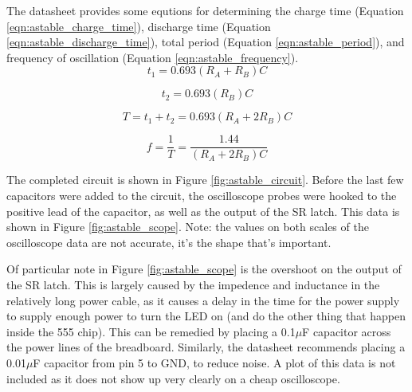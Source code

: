 \documentclass[12pt]{article}
\begin{document}
\begin{FlushLeft}
The datasheet provides some equtions for determining the charge time (Equation \ref{eqn:astable_charge_time}), discharge time (Equation \ref{eqn:astable_discharge_time}), total period (Equation \ref{eqn:astable_period}), and frequency of oscillation (Equation \ref{eqn:astable_frequency}). \\

\begin{equation}
  \label{eqn:astable_charge_time}
  t_1 = 0.693 ( R_A + R_B ) C
\end{equation}

\begin{equation}
  \label{eqn:astable_discharge_time}
  t_2 = 0.693 ( R_B ) C
\end{equation}

\begin{equation}
  \label{eqn:astable_period}
  T = t_1 + t_2 = 0.693 ( R_A + 2 R_B ) C
\end{equation}

\begin{equation}
  \label{eqn:astable_frequency}
  f = \frac{1}{T} = \frac{1.44}{( R_A + 2 R_B ) C}
\end{equation}

\vspace{0.5cm}

The completed circuit is shown in Figure \ref{fig:astable_circuit}. Before the last few capacitors were added to the circuit, the oscilloscope probes were hooked to the positive lead of the capacitor, as well as the output of the SR latch. This data is shown in Figure \ref{fig:astable_scope}. Note: the values on both scales of the oscilloscope data are not accurate, it's the shape that's important. \\

\vspace{0.3cm}

Of particular note in Figure \ref{fig:astable_scope} is the overshoot on the output of the SR latch. This is largely caused by the impedence and inductance in the relatively long power cable, as it causes a delay in the time for the power supply to supply enough power to turn the LED on (and do the other thing that happen inside the 555 chip). This can be remedied by placing a 0.1$\mu$F capacitor across the power lines of the breadboard. Similarly, the datasheet recommends placing a 0.01$\mu$F capacitor from pin 5 to GND, to reduce noise. A plot of this data is not included as it does not show up very clearly on a cheap oscilloscope. \\


\end{FlushLeft}
\end{document}
